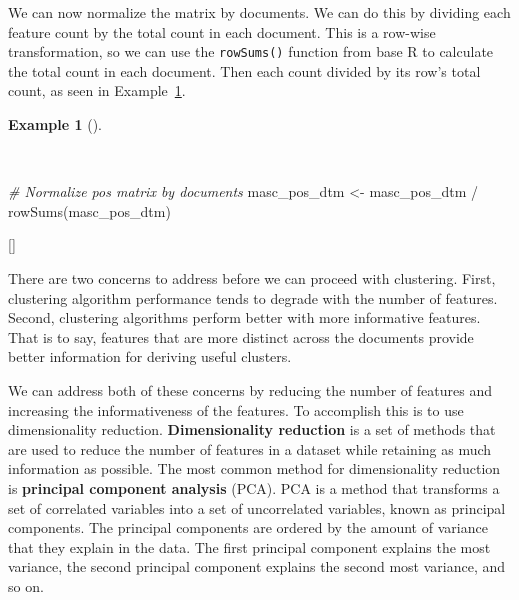 \documentclass[
  letterpaper,
  krantz1]{latex/krantz-mod}
\newenvironment{Shaded}{\begin{snugshade}}{\end{snugshade}}
\newcommand{\CommentTok}[1]{\textcolor[rgb]{0.00,0.00,0.00}{\textit{#1}}}
\newcommand{\FunctionTok}[1]{\textcolor[rgb]{0.00,0.00,0.00}{#1}}
\newcommand{\NormalTok}[1]{\textcolor[rgb]{0.00,0.00,0.00}{#1}}
\newcommand{\OtherTok}[1]{\textcolor[rgb]{0.00,0.00,0.00}{#1}}
\newcommand{\SpecialCharTok}[1]{\textcolor[rgb]{0.00,0.00,0.00}{#1}}
\newcommand{\cindex}[1]{%
  \StrSubstitute{#1}{_}{\_}[\temp]%
  \index{\temp}%
}
\theoremstyle{definition}
\theoremstyle{definition}
\newtheorem{example}{Example}[chapter]
\theoremstyle{remark}
\begin{document}
We can now normalize the matrix by documents. We can do this by dividing
each feature count by the total count in each document. This is a
row-wise transformation, so we can use the \texttt{rowSums()} function
from base R to calculate the total count in each document. Then each
count divided by its row's total count, as seen in
Example~\ref{exm-explore-masc-dtms-normalized}.

\begin{example}[]\protect\hypertarget{exm-explore-masc-dtms-normalized}{}\label{exm-explore-masc-dtms-normalized}

~

\begin{Shaded}
\begin{Highlighting}[numbers=left,,]
\CommentTok{\# Normalize pos matrix by documents}
\NormalTok{masc\_pos\_dtm }\OtherTok{\textless{}{-}}
\NormalTok{  masc\_pos\_dtm }\SpecialCharTok{/} \FunctionTok{rowSums}\NormalTok{(masc\_pos\_dtm)}
\end{Highlighting}
\end{Shaded}

\cindex{rowSums()}

\end{example}

There are two concerns to address before we can proceed with
clustering. First, clustering algorithm performance
tends to degrade with the number of features. Second, clustering
algorithms perform better with more informative features. That is to
say, features that are more distinct across the documents provide better
information for deriving useful clusters.

We can address both of these concerns by reducing the number of features
and increasing the informativeness of the features. To accomplish this
is to use dimensionality reduction. \textbf{Dimensionality
reduction} is a set of methods that are
used to reduce the number of features in a dataset while retaining as
much information as possible. The most common method for dimensionality
reduction is \textbf{principal component analysis}
(PCA). PCA is a method that
transforms a set of correlated variables into a set of uncorrelated
variables, known as principal components. The principal components are
ordered by the amount of variance that they explain in the data. The
first principal component explains the most variance, the second
principal component explains the second most variance, and so on.
\end{document}
